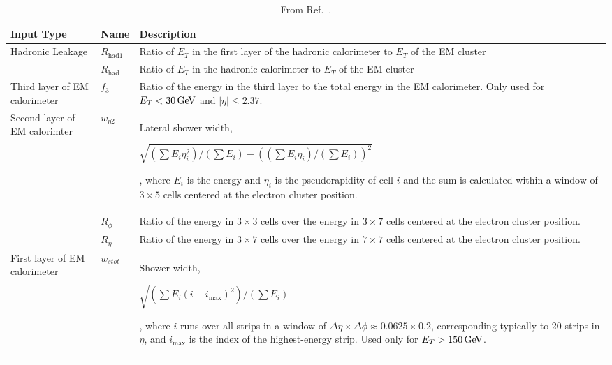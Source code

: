\begin{table}[!htb]
    \caption{
        From Ref.~\cite{Aad:2019tso}.
    }
    \label{tab:egamma_lh_inputs}
    \begin{scriptsize}
    \begin{center}
    \begin{tabularx}{\textwidth}{|X|l|X|}
    \hline
    \hline
    \textbf{Input Type} & \textbf{Name} & \textbf{Description} \\
    \hline
    \multirow{2}{*}{Hadronic Leakage} & $R_{\text{had1}}$ & Ratio of $E_T$ in the first layer of the hadronic calorimeter to $E_T$ of the EM cluster \\
    \cline{2-3}
                & $R_{\text{had}}$ & Ratio of $E_T$ in the hadronic calorimeter to $E_T$ of the EM cluster \\
    \hline
    \multirow{1}{*}{Third layer of EM calorimeter} & $f_3$ & Ratio of the energy in the third layer to the total energy in the
            EM calorimeter. Only used for $E_T<30\,\text{Ge\kern -0.1em V}$  and $\lvert \eta \rvert \le 2.37$. \\
    \hline
    \multirow{3}{*}{Second layer of EM calorimter} & $w_{\eta 2}$ & Lateral shower width,
            \begin{small}$\sqrt{(\sum E_i \eta_i^2) / (\sum E_i) - ((\sum E_i \eta_i) / (\sum E_i))^2}$\end{small},
            where $E_i$ is the energy and $\eta_i$ is the pseudorapidity of cell $i$ and the sum
            is calculated within a window of $3\times5$ cells centered at the electron cluster position. \\ \cline{2-3}
            & $R_{\phi}$ & Ratio of the energy in $3\times 3$ cells over the energy in $3\times7$ cells
            centered at the electron cluster position. \\ \cline{2-3}
            & $R_{\eta}$ & Ratio of the energy in $3\times 7$ cells over the energy in $7\times7$ cells
            centered at the electron cluster position. \\ \cline{2-3}
    \hline
    \multirow{3}{*}{First layer of EM calorimeter} & $w_{stot}$ & Shower width,
            \begin{small} $\sqrt{ (\sum E_i(i - i_{\text{max}})^2)/(\sum E_i)}$ \end{small}, where $i$ runs
            over all strips in a window of $\Delta \eta \times \Delta \phi \approx 0.0625 \times 0.2$,
            corresponding typically to 20 strips in $\eta$, and $i_{\text{max}}$ is the index of the
            highest-energy strip. Used only for $E_T > 150\,\text{Ge\kern -0.1em V}$.\\ \cline{2-3}

\end{tabularx}
\end{center}
\end{scriptsize}
\end{table}
